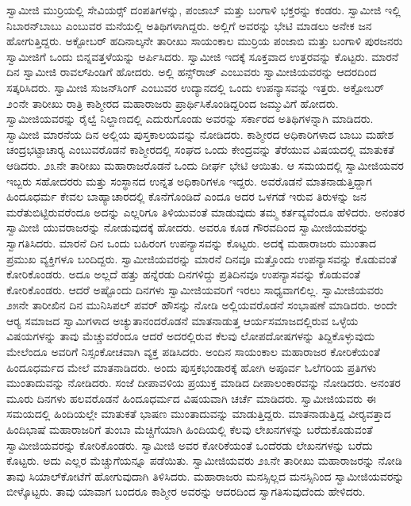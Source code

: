  ಸ್ವಾಮೀಜಿ ಮುರ‍್ರಿಯಲ್ಲಿ ಸೇವಿಯರ್ಸ್‍‍ ದಂಪತಿಗಳನ್ನು, ಪಂಜಾಬ್ ಮತ್ತು ಬಂಗಾಳಿ ಭಕ್ತರನ್ನು ಕಂಡರು. ಸ್ವಾಮೀಜಿ ಇಲ್ಲಿ ನಿಬಾರನ್‍ಬಾಬು ಎಂಬುವರ ಮನೆಯಲ್ಲಿ ಅತಿಥಿಗಳಾಗಿದ್ದರು. ಅಲ್ಲಿಗೆ ಅವರನ್ನು ಭೇಟಿ ಮಾಡಲು ಅನೇಕ ಜನ ಹೋಗುತ್ತಿದ್ದರು. ಅಕ್ಟೋಬರ್ ಹದಿನಾಲ್ಕನೇ ತಾರೀಖು ಸಾಯಂಕಾಲ ಮುರ‍್ರಿಯ ಪಂಜಾಬಿ ಮತ್ತು ಬಂಗಾಳಿ ಪುರಜನರು ಸ್ವಾಮೀಜಿಗೆ ಒಂದು ಬಿನ್ನವತ್ತಳೆಯನ್ನು ಅರ್ಪಿಸಿದರು. ಸ್ವಾಮೀಜಿ ಇದಕ್ಕೆ ಸೂಕ್ತವಾದ ಉತ್ತರವನ್ನು ಕೊಟ್ಟರು. ಮಾರನೆ ದಿನ ಸ್ವಾಮೀಜಿ ರಾವಲ್‍ಪಿಂಡಿಗೆ ಹೋದರು. ಅಲ್ಲಿ ಹನ್ಸ್‌ರಾಜ್ ಎಂಬುವರು ಸ್ವಾಮೀಜಿಯವರನ್ನು ಆದರದಿಂದ ಸತ್ಕರಿಸಿದರು. ಸ್ವಾಮೀಜಿ ಸುಜನ್‍ಸಿಂಗ್ ಎಂಬುವರ ಉದ್ಯಾನದಲ್ಲಿ ಒಂದು ಉಪನ್ಯಾಸವನ್ನು ಇತ್ತರು. ಅಕ್ಟೋಬರ್ ೨೦ನೇ ತಾರೀಖು ರಾತ್ರಿ ಕಾಶ್ಮೀರದ ಮಹಾರಾಜರು ಪ್ರಾರ್ಥಿಸಿಕೊಂಡಿದ್ದರಿಂದ ಜಮ್ಮುವಿಗೆ ಹೋದರು. ಸ್ವಾಮೀಜಿಯವರನ್ನು ರೈಲ್ವೆ ನಿಲ್ದಾಣದಲ್ಲಿ ಎದುರುಗೊಂಡು ಅವರನ್ನು ಸರ್ಕಾರದ ಅತಿಥಿಗಳನ್ನಾಗಿ ಮಾಡಿದರು. ಸ್ವಾಮೀಜಿ ಮಾರನೆಯ ದಿನ ಅಲ್ಲಿಯ ಪುಸ್ತಕಾಲಯವನ್ನು ನೋಡಿದರು. ಕಾಶ್ಮೀರದ ಅಧಿಕಾರಿಗಳಾದ ಬಾಬು ಮಹೇಶ ಚಂದ್ರಭಟ್ಟಾಚಾರ‍್ಯ ಎಂಬುವರೊಡನೆ ಕಾಶ್ಮೀರದಲ್ಲಿ ಸಂಘದ ಒಂದು ಕೇಂದ್ರವನ್ನು ತೆರೆಯುವ ವಿಷಯದಲ್ಲಿ ಮಾತುಕತೆ ಆಡಿದರು. ೨೩ನೇ ತಾರೀಖು ಮಹಾರಾಜರೊಡನೆ ಒಂದು ದೀರ್ಘ ಭೇಟಿ ಆಯಿತು. ಆ ಸಮಯದಲ್ಲಿ ಸ್ವಾಮೀಜಿಯವರ ಇಬ್ಬರು ಸಹೋದರರು ಮತ್ತು ಸಂಸ್ಥಾನದ ಉನ್ನತ ಅಧಿಕಾರಿಗಳೂ ಇದ್ದರು. ಅವರೊಡನೆ ಮಾತನಾಡುತ್ತಿದ್ದಾಗ ಹಿಂದೂಧರ್ಮ ಕೇವಲ ಬಾಹ್ಯಾಚಾರದಲ್ಲಿ ಕೊನೆಗೊಂಡಿದೆ ಎಂದೂ ಅದರ ಒಳಗಡೆ ಇರುವ ತಿರುಳನ್ನು ಜನ ಮರೆತುಬಿಟ್ಟಿರುವರೆಂದೂ ಅದನ್ನು ಎಲ್ಲರಿಗೂ ತಿಳಿಯುವಂತೆ ಮಾಡುವುದು ತಮ್ಮ ಕರ್ತವ್ಯವೆಂದೂ ಹೆಳಿದರು. ಅನಂತರ ಸ್ವಾಮೀಜಿ ಯುವರಾಜರನ್ನು ನೋಡುವುದಕ್ಕೆ ಹೋದರು. ಅವರೂ ಕೂಡ ಗೌರವದಿಂದ ಸ್ವಾಮೀಜಿಯವರನ್ನು ಸ್ವಾಗತಿಸಿದರು. ಮಾರನೆ ದಿನ ಒಂದು ಬಹಿರಂಗ ಉಪನ್ಯಾಸವನ್ನು ಕೊಟ್ಟರು. ಅದಕ್ಕೆ ಮಹಾರಾಜರು ಮುಂತಾದ ಪ್ರಮುಖ ವ್ಯಕ್ತಿಗಳೂ ಬಂದಿದ್ದರು. ಸ್ವಾಮೀಜಿಯವರನ್ನು ಮಾರನೆ ದಿನವೂ ಮತ್ತೊಂದು ಉಪನ್ಯಾಸವನ್ನು ಕೊಡುವಂತೆ ಕೋರಿಕೊಂಡರು. ಅದೂ ಅಲ್ಲದೆ ಹತ್ತು ಹನ್ನೆರಡು ದಿನಗಳಿದ್ದು ಪ್ರತಿದಿನವೂ ಉಪನ್ಯಾಸವನ್ನು ಕೊಡುವಂತೆ ಕೋರಿಕೊಂಡರು. ಆದರೆ ಅಷ್ಟೊಂದು ದಿನಗಳು ಸ್ವಾಮೀಜಿಯವರಿಗೆ ಇರಲು ಸಾಧ್ಯವಾಗಲಿಲ್ಲ. ಸ್ವಾಮೀಜಿಯವರು ೨೫ನೇ ತಾರೀಖಿನ ದಿನ ಮುನಿಸಿಪಲ್ ಪವರ್ ಹೌಸನ್ನು ನೋಡಿ ಅಲ್ಲಿಯವರೊಡನೆ ಸಂಭಾಷಣೆ ಮಾಡಿದರು. ಅಂದೇ ಆರ‍್ಯ ಸಮಾಜದ ಸ್ವಾಮಿಗಳಾದ ಅಚ್ಯುತಾನಂದರೊಡನೆ ಮಾತನಾಡುತ್ತ ಆರ್ಯಸಮಾಜದಲ್ಲಿರುವ ಒಳ್ಳೆಯ ವಿಷಯಗಳನ್ನು ತಾವು ಮೆಚ್ಚುವರೆಂದೂ ಆದರೆ ಅದರಲ್ಲಿರುವ ಕೆಲವು ಲೋಪದೋಷಗಳನ್ನು ತಿದ್ದಿಕೊಳ್ಳುವುದು ಮೇಲೆಂದೂ‌ ಅವರಿಗೆ ನಿಸ್ಸಂಕೋಚವಾಗಿ ವ್ಯಕ್ತ ಪಡಿಸಿದರು. ಅಂದಿನ ಸಾಯಂಕಾಲ ಮಹಾರಾಜರ ಕೋರಿಕೆಯಂತೆ ಹಿಂದೂಧರ್ಮದ ಮೇಲೆ ಮಾತನಾಡಿದರು. ಅಂದು ಪುಸ್ತಕಭಂಡಾರಕ್ಕೆ ಹೋಗಿ ಅಪೂರ್ವ ಓಲೆಗರಿಯ ಪ್ರತಿಗಳು ಮುಂತಾದುವನ್ನು ನೋಡಿದರು. ಸಂಜೆ ದೀಪಾವಳಿಯ ಪ್ರಯುಕ್ತ ಮಾಡಿದ ದೀಪಾಲಂಕಾರವನ್ನು ನೋಡಿದರು. ಅನಂತರ ಮೂರು ದಿನಗಳು ಹಲವರೊಡನೆ ಹಿಂದೂಧರ್ಮದ ವಿಷಯವಾಗಿ ಚರ್ಚೆ ಮಾಡಿದರು. ಸ್ವಾಮೀಜಿಯವರು ಈ ಸಮಯದಲ್ಲಿ ಹಿಂದಿಯಲ್ಲೇ ಮಾತುಕತೆ ಭಾಷಣ ಮುಂತಾದುವನ್ನು ಮಾಡುತ್ತಿದ್ದರು. ಮಾತನಾಡುತ್ತಿದ್ದ ವೀರ‍್ಯವತ್ತಾದ ಹಿಂದಿಭಾಷೆ ಮಹಾರಾಜರಿಗೆ ತುಂಬಾ ಮೆಚ್ಚಿಗೆಯಾಗಿ ಹಿಂದಿಯಲ್ಲಿ ಕೆಲವು ಲೇಖನಗಳನ್ನು ಬರೆದುಕೊಡುವಂತೆ ಸ್ವಾಮೀಜಿಯವರನ್ನು ಕೋರಿಕೊಂಡರು. ಸ್ವಾಮೀಜಿ ಅವರ ಕೋರಿಕೆಯಂತೆ ಒಂದೆರಡು ಲೇಖನಗಳನ್ನು ಬರೆದು ಕೊಟ್ಟರು. ಅದು ಎಲ್ಲರ ಮೆಚ್ಚುಗೆಯನ್ನೂ ಪಡೆಯಿತು. ಸ್ವಾಮೀಜಿಯವರು ೨೩ನೇ ತಾರೀಖು ಮಹಾರಾಜರನ್ನು ನೋಡಿ ತಾವು ಸಿಯಾಲ್‍ಕೋಟೆಗೆ ಹೋಗುವುದಾಗಿ ತಿಳಿಸಿದರು. ಮಹಾರಾಜರು ಮನಸ್ಸಿಲ್ಲದ ಮನಸ್ಸಿನಿಂದ ಸ್ವಾಮೀಜಿಯವರನ್ನು ಬೀಳ್ಕೊಟ್ಟರು. ತಾವು ಯಾವಾಗ ಬಂದರೂ ಕಾಶ್ಮೀರ ಅವರನ್ನು ಆದರದಿಂದ ಸ್ವಾಗತಿಸುವುದೆಂದು ಹೇಳಿದರು. 

